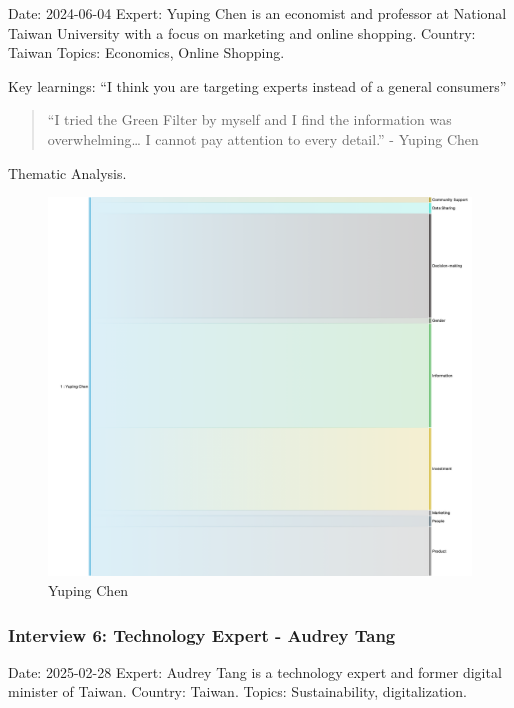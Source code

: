 \documentclass[
  12pt,
  letterpaper,
  DIV=11,
  numbers=noendperiod]{scrartcl}
\begin{document}
Date: 2024-06-04 Expert: Yuping Chen is an economist and professor at
National Taiwan University with a focus on marketing and online
shopping. Country: Taiwan Topics: Economics, Online Shopping.

Key learnings: ``I think you are targeting experts instead of a general
consumers''

\begin{quote}
``I tried the Green Filter by myself and I find the information was
overwhelming\ldots{} I cannot pay attention to every detail.'' - Yuping
Chen
\end{quote}

Thematic Analysis.

\begin{figure}[H]

{\centering \includegraphics[width=1\linewidth,height=\textheight,keepaspectratio]{./images/experts/sankey-yuping.png}

}

\caption{Yuping Chen}

\end{figure}%

\subsubsection{Interview 6: Technology Expert - Audrey
Tang}\label{interview-6-technology-expert---audrey-tang}

Date: 2025-02-28 Expert: Audrey Tang is a technology expert and former
digital minister of Taiwan. Country: Taiwan. Topics: Sustainability,
digitalization.
\end{document}
